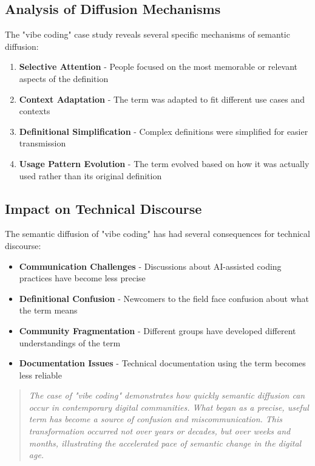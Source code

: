 \documentclass[11pt]{article}
\begin{document}
\subsection{Analysis of Diffusion Mechanisms}

The "vibe coding" case study reveals several specific mechanisms of semantic diffusion:

\begin{enumerate}
\item \textbf{Selective Attention} - People focused on the most memorable or relevant aspects of the definition
\item \textbf{Context Adaptation} - The term was adapted to fit different use cases and contexts
\item \textbf{Definitional Simplification} - Complex definitions were simplified for easier transmission
\item \textbf{Usage Pattern Evolution} - The term evolved based on how it was actually used rather than its original definition
\end{enumerate}

\subsection{Impact on Technical Discourse}

The semantic diffusion of "vibe coding" has had several consequences for technical discourse:

\begin{itemize}
\item \textbf{Communication Challenges} - Discussions about AI-assisted coding practices have become less precise
\item \textbf{Definitional Confusion} - Newcomers to the field face confusion about what the term means
\item \textbf{Community Fragmentation} - Different groups have developed different understandings of the term
\item \textbf{Documentation Issues} - Technical documentation using the term becomes less reliable
\end{itemize}

\begin{quote}
\emph{The case of "vibe coding" demonstrates how quickly semantic diffusion can occur in contemporary digital communities. What began as a precise, useful term has become a source of confusion and miscommunication. This transformation occurred not over years or decades, but over weeks and months, illustrating the accelerated pace of semantic change in the digital age.}
\end{quote}
\end{document}
